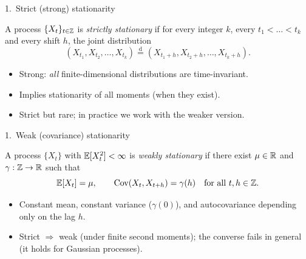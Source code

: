 \documentclass[aspectratio=169]{beamer}
\begin{document}
\begin{frame}{1.~Strict (strong) stationarity}
  \begin{defbox}
    A process $\{X_t\}_{t \in \mathbb{Z}}$ is \emph{strictly stationary} if for
    every integer $k$, every $t_1 < \dots < t_k$ and every shift $h$,
    the joint distribution
    \[
      (X_{t_1}, X_{t_2}, \dots, X_{t_k})
      \overset{\text{d}}{=}
      (X_{t_1+h}, X_{t_2+h}, \dots, X_{t_k+h}).
    \]
  \end{defbox}
  \medskip
  \begin{itemize}
    \item Strong: \emph{all} finite-dimensional distributions are time-invariant.
    \item Implies stationarity of all moments (when they exist).
    \item Strict but rare; in practice we work with the weaker version.
  \end{itemize}
\end{frame}

\begin{frame}{1.~Weak (covariance) stationarity}
  \begin{defbox}
    A process $\{X_t\}$ with $\mathbb{E}[X_t^2] < \infty$ is \emph{weakly
    stationary} if there exist $\mu \in \mathbb{R}$ and $\gamma : \mathbb{Z} \to \mathbb{R}$ such that
    \[
      \mathbb{E}[X_t] = \mu, \qquad \mathrm{Cov}(X_t, X_{t+h}) = \gamma(h)
      \quad \text{for all } t, h \in \mathbb{Z}.
    \]
  \end{defbox}
  \medskip
  \begin{itemize}
    \item Constant mean, constant variance ($\gamma(0)$), and
          autocovariance depending only on the lag $h$.
    \item Strict $\Rightarrow$ weak (under finite second moments);
          the converse fails in general (it holds for Gaussian processes).
  \end{itemize}
\end{frame}
\end{document}

